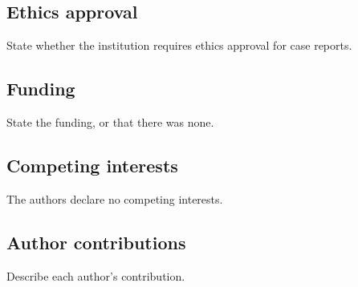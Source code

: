 \documentclass[11pt,a4paper]{article}
\begin{document}
\subsection*{Ethics approval}
State whether the institution requires ethics approval for case reports.

\subsection*{Funding}
State the funding, or that there was none.

\subsection*{Competing interests}
The authors declare no competing interests.

\subsection*{Author contributions}
Describe each author's contribution.



\end{document}
